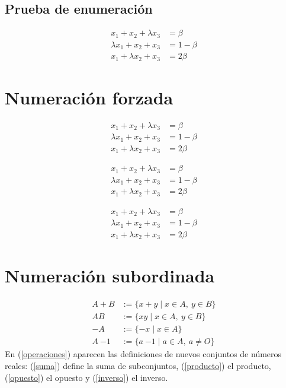\documentclass[12pt]{book}
\numberwithin{equation}{section}
\theoremstyle{plain}  %
\begin{document}
\subsection{Prueba de enumeración}

\begin{align}
				x_1+x_2+\lambda x_3&=\beta\\
	\lambda x_1+x_2+x_3&=1-\beta\\
	x_1+\lambda x_2+x_3&=2\beta
\end{align}

\section{Numeración forzada}

\begin{align*}
				x_1+x_2+\lambda x_3&=\beta \tag*{(*)}\\
	\lambda x_1+x_2+x_3&=1-\beta \tag*{(**)}\\
	x_1+\lambda x_2+x_3&=2\beta  \tag*{(***)}
\end{align*}

\begin{align}
	x_1+x_2+\lambda x_3&=\beta \tag*{(*)}\\
	\lambda x_1+x_2+x_3&=1-\beta \tag*{(**)}\\
	x_1+\lambda x_2+x_3&=2\beta  \tag*{(***)}
\end{align}

\begin{align}
	x_1+x_2+\lambda x_3&=\beta \\
	\lambda x_1+x_2+x_3&=1-\beta \\
	x_1+\lambda x_2+x_3&=2\beta 
\end{align}

\section{Numeración subordinada}

\begin{subequations}\label{operaciones}
\begin{align}
A+B &:= \{x+y \mid x\in A,\ y\in B\} \label{suma}\\
AB &:= \{xy \mid x\in A,\ y\in B\} \label{producto}\\
-A &:= \{-x \mid x\in A\} \label{opuesto}\\
A~{-1} &:= \{a~{-1} \mid a\in A,\ a\ne O\} \label{inverso}
\end{align}
\end{subequations}
En (\ref{operaciones}) aparecen las definiciones de nuevos
conjuntos de números reales: (\ref{suma}) define la suma de
subconjuntos, (\ref{producto}) el producto, (\ref{opuesto}) el
opuesto y (\ref{inverso}) el inverso.
\end{document}
